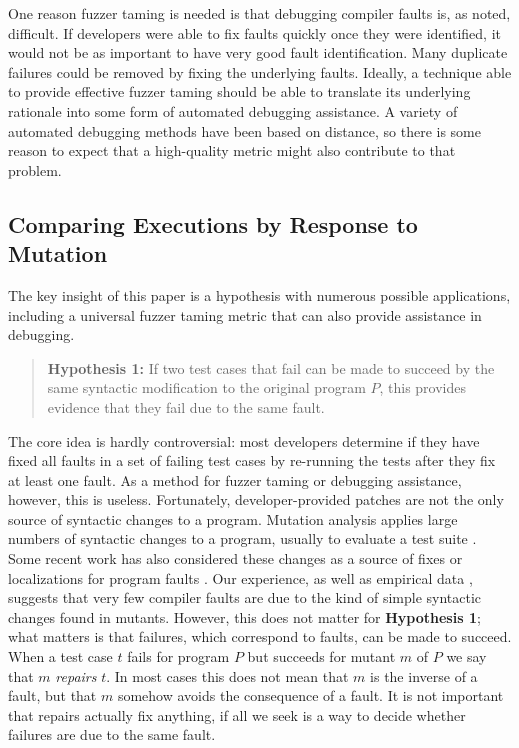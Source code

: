 One reason fuzzer taming is needed is that debugging compiler faults is, as noted, difficult.  If developers were able to fix faults quickly once they were identified, it would not be as important to have very good fault identification.  Many duplicate failures could be removed by fixing the underlying faults.  Ideally, a technique able to provide effective fuzzer taming should be able to translate its underlying rationale into some form of automated debugging assistance.   A variety of automated debugging methods \cite{NearNeighbor,GroceError} have been based on distance, so there is some reason to expect that a high-quality metric might also contribute to that problem.

\subsection{Comparing Executions by Response to Mutation}

The key insight of this paper is a hypothesis with numerous possible applications, including a universal fuzzer taming metric that can also provide assistance in debugging.  

\begin{quote}
{\bf Hypothesis 1:} If two test cases that fail can be made to succeed by the same syntactic modification to the original program $P$, this provides evidence that they fail due to the same fault.
\end{quote}

The core idea is hardly controversial:  most developers determine if they have fixed all faults in a set of failing test cases by re-running the tests after they fix at least one fault.  As a method for fuzzer taming or debugging assistance, however, this is useless.  Fortunately, developer-provided patches are not the only source of syntactic changes to a program.  Mutation analysis \cite{demillo1978hints,budd1980theoretical} applies large numbers of syntactic changes to a program, usually to evaluate a test suite \cite{mutant,justmutants}.  Some recent work has also considered these changes as a source of fixes or localizations for program faults \cite{achour,multilingual,MUSE,DebroyMutant}.  Our experience, as well as empirical data \cite{GopinathMutants}, suggests that very few compiler faults are due to the kind of simple syntactic changes found in mutants.  However, this does not matter for {\bf Hypothesis 1};  what matters is that failures, which correspond to faults, can be made to succeed.  When a test case $t$ fails for program $P$ but succeeds for mutant $m$ of $P$ we say that $m$ \emph{repairs} $t$.  In most cases this does not mean that $m$ is the inverse of a fault, but that $m$ somehow avoids the consequence of a fault.  It is not important that repairs actually fix anything, if all we seek is a way to decide whether failures are due to the same fault.

